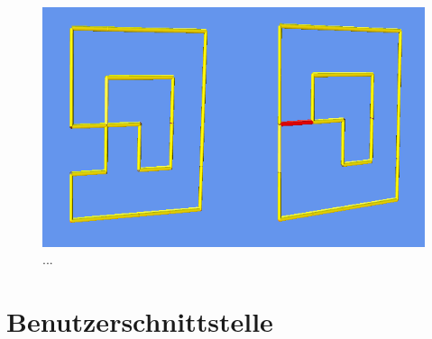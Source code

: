 	\begin{figure}[htb]
	  \centering
	  \includegraphics[width = \textwidth]{Systemmodelle/Ungueltiger_Zug2.png}
	  \caption{...}
	  \label{fig:zug2}
	\end{figure}

\section{Benutzerschnittstelle}

%	  
%
%	  
